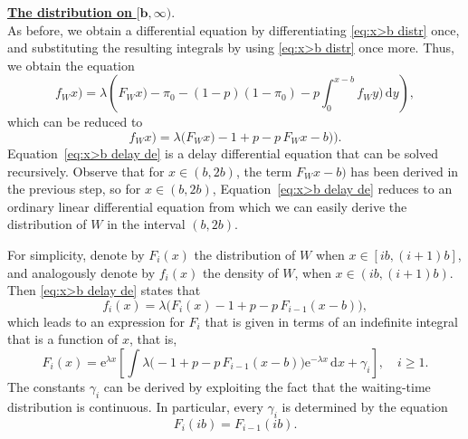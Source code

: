 \documentclass[reqno, 11pt, a4paper]{article}
\theoremstyle{plain}
\theoremstyle{remark}
\numberwithin{equation}{section}
\begin{document}
\noindent
\underline{\textbf{The distribution on} $\mathbf{[b,\infty)}.$}\\

As before, we obtain a differential equation by differentiating \eqref{eq:x>b distr} once, and substituting the resulting integrals by using \eqref{eq:x>b distr} once more. Thus, we obtain the equation
$$
{\mbox{$f_W^{}$}}x)=\lambda\left({\mbox{$F_W^{}$}}x)-\pi_0-(1-p)(1-\pi_0)-p\int_0^{x-b} {\mbox{$f_W^{}$}}y)\,\mathrm{d}y\right),
$$
which can be reduced to
\begin{equation}\label{eq:x>b delay de}
{\mbox{$f_W^{}$}}x)=\lambda\bigl({\mbox{$F_W^{}$}}x)-1+p-p\,{\mbox{$F_W^{}$}}x-b)\bigr).
\end{equation}
Equation~\eqref{eq:x>b delay de} is a delay differential equation that can be solved recursively. Observe that for $x\in(b,2b)$, the term ${\mbox{$F_W^{}$}}x-b)$ has been derived in the previous step, so for $x\in(b,2b)$, Equation~\eqref{eq:x>b delay de} reduces to an ordinary linear differential equation from which we can easily derive the distribution of $W$ in the interval $(b,2b)$.

For simplicity, denote by $F_i (x)$ the distribution of $W$ when $x\in[ib,(i+1)b]$, and analogously denote by $f_i (x)$ the density of $W$, when $x\in(ib,(i+1)b)$. Then \eqref{eq:x>b delay de} states that
$$
f_i(x)=\lambda\bigl(F_i(x)-1+p-p\,F_{i-1}(x-b)\bigr),
$$
which leads to an expression for $F_i$ that is given in terms of an indefinite integral that is a function of $x$, that is,
\begin{equation}\label{eq:Distr formal x>b}
F_i(x)=\mathrm{e}^{\lambda x} \left[\int \lambda \bigl(-1+p-p\,F_{i-1}(x-b)\bigr) \mathrm{e}^{-\lambda x} \,\mathrm{d}x+\gamma_i\right],\quad i\geqslant 1.
\end{equation}
The constants $\gamma_i$ can be derived by exploiting the fact that the waiting-time distribution is continuous. In particular, every $\gamma_i$ is determined by the equation
\begin{equation}\label{8eq:asdf}
F_i(ib)=F_{i-1}(ib).
\end{equation}
\end{document}
